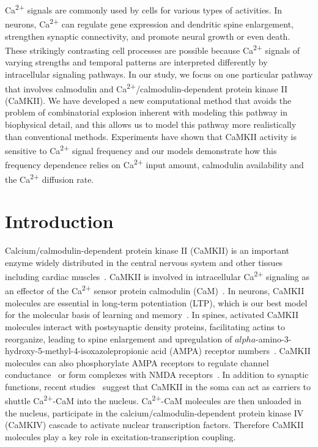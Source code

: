 \documentclass[10pt,letterpaper]{article}
\begin{document}
Ca\textsuperscript{2+} signals are commonly used by cells for various types of activities. In neurons, Ca\textsuperscript{2+} can regulate gene expression and dendritic spine enlargement, strengthen synaptic connectivity, and promote neural growth or even death. These strikingly contrasting cell processes are possible because Ca\textsuperscript{2+} signals of varying strengths and temporal patterns are interpreted differently by intracellular signaling pathways. In our study, we focus on one particular pathway that involves calmodulin and Ca\textsuperscript{2+}/calmodulin-dependent protein kinase II (CaMKII). We have developed a new computational method that avoids the problem of combinatorial explosion inherent with modeling this pathway in biophysical detail, and this allows us to model this pathway more realistically than conventional methods. Experiments have shown that CaMKII activity is sensitive to Ca\textsuperscript{2+} signal frequency and our models demonstrate how this frequency dependence relies on Ca\textsuperscript{2+} input amount, calmodulin availability and the Ca\textsuperscript{2+} diffusion rate.

\linenumbers
\section*{Introduction}
Calcium/calmodulin-dependent protein kinase II (CaMKII) is an important enzyme widely distributed in the central nervous system and other tissues including cardiac muscles~\cite{Wayman:2008gla,Lisman:2002ki,Erickson:2014fs}. CaMKII is involved in intracellular Ca\textsuperscript{2+} signaling as an effector of the Ca\textsuperscript{2+} sensor protein calmodulin (CaM)~\cite{Herring:2016bh,Hell:2014bd,Coultrap:2012ip}. In neurons, CaMKII molecules are essential in long-term potentiation (LTP), which is our best model for the molecular basis of learning and memory~\cite{Bliss:1973jg}. In spines, activated CaMKII molecules interact with postsynaptic density proteins, facilitating actins to reorganize, leading to spine enlargement and upregulation of $alpha$-amino-3-hydroxy-5-methyl-4-isoxazolepropionic acid (AMPA) receptor numbers~\cite{Herring:2016bh}. CaMKII molecules can also phosphorylate AMPA receptors to regulate channel conductance~\cite{Herring:2016bh,Coultrap:2012ip} or form complexes with NMDA receptors~\cite{Hell:2014bd}. In addition to synaptic functions, recent studies~\cite{Ma:2014dr,Li:2016cq} suggest that CaMKII in the soma can act as carriers to shuttle Ca\textsuperscript{2+}-CaM into the nucleus. Ca\textsuperscript{2+}-CaM molecules are then unloaded in the nucleus, participate in the calcium/calmodulin-dependent protein kinase IV (CaMKIV) cascade to activate nuclear transcription factors. Therefore CaMKII molecules play a key role in excitation-transcription coupling. 
\end{document}
